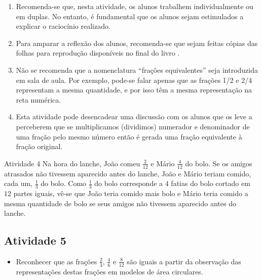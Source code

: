 \begin{enumerate} [\quad a)] %
    \item       Recomenda-se que, nesta atividade, os alunos trabalhem
individualmente ou em duplas. No entanto, é fundamental que os alunos sejam
estimulados a explicar o raciocínio realizado.
    \item       Para amparar a reflexão dos alunos, recomenda-se que sejam
feitas cópias das             folhas para reprodução disponíveis no final do
livro      .
    \item       Não se recomenda que a nomenclatura       ``frações
equivalentes''       seja introduzida em sala de aula. Por exemplo, pode-se
falar apenas que as frações 1/2 e 2/4 representam a mesma quantidade, e por isso
têm a mesma representação na reta numérica.
    \item       Esta atividade pode desencadear uma discussão com os alunos que
os leve a perceberem que se multiplicamos (dividimos) numerador e denominador de
uma fração pelo mesmo número então é gerada uma fração equivalente à fração
original.
\end{enumerate} %

\begin{resposta*}{Atividade 4}
  Na hora do lanche, João comeu   $\frac{2}{12}$   e Mário   $\frac{4}{12}$   do
bolo. Se os amigos atrasados não tivessem aparecido antes do lanche, João e
Mário teriam comido, cada um,   $\frac{1}{3}$   do bolo. Como   $\frac{1}{3}$
do bolo corresponde a   $4$   fatias do bolo cortado em   $12$   partes iguais,
vê-se que João teria comido mais bolo e Mário teria comido a mesma quantidade de
bolo se seus amigos não tivessem aparecido antes do lanche.
\end{resposta*}

\newpage

\subsection{Atividade 5}

\begin{itemize} %
    \item       Reconhecer que as frações       $\frac{2}{3}$,
$\frac{4}{6}$       e       $\frac{8}{12}$       são iguais a partir da
observação das representações destas frações em modelos de área circulares.
\end{itemize} %


